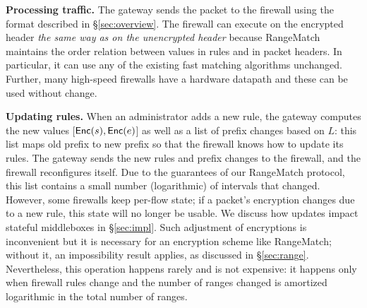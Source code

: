 \noindent\textbf{Processing traffic.}
The gateway sends the packet to the firewall using the format described in \S\ref{sec:overview}. The firewall can execute on the encrypted header {\em
the same way as on the unencrypted header} because RangeMatch maintains the order relation between values in rules and in 
packet headers. 
In particular, it can use any of the existing fast matching algorithms unchanged. 
Further, many high-speed firewalls have a hardware datapath and these can be used without change.


\noindent\textbf{Updating rules.} 
When an administrator adds a new rule, the gateway computes the new values [$\mathsf{Enc}(s), \mathsf{Enc}(e)$] as well as a list of prefix changes based on $L$: this list maps old prefix to new prefix so that the firewall knows how to update its rules. 
The gateway sends the new rules and prefix changes to the firewall, and the firewall reconfigures itself. 
  Due to the guarantees of our RangeMatch protocol, this list contains a 
small number (logarithmic) of intervals that changed.
However, some firewalls keep per-flow state; if a packet's encryption changes due to a new rule, this state will no longer be usable.
We discuss how updates impact stateful middleboxes in \S\ref{sec:impl}.
Such adjustment of encryptions is inconvenient but it is  necessary for an encryption scheme like RangeMatch; without it, an impossibility result applies, as discussed in \S\ref{sec:range}. Nevertheless, this operation happens rarely and is not expensive: it happens only when firewall rules change and the number of ranges changed is  amortized logarithmic in the total number of ranges. 
 



